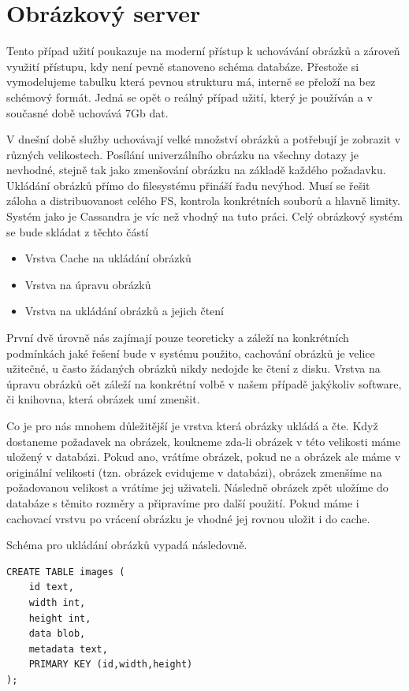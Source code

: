 \section{Obrázkový server}
Tento případ užití poukazuje na moderní přístup k uchovávání obrázků a zároveň využití přístupu, kdy není pevně stanoveno schéma databáze. Přestože si vymodelujeme tabulku která pevnou strukturu má, interně se přeloží na bez schémový formát. Jedná se opět o reálný případ užití, který je používán a v současné době uchovává 7Gb dat. 

V dnešní době služby uchovávají velké množství obrázků a potřebují je zobrazit v různých velikostech. Posílání univerzálního obrázku na všechny dotazy je nevhodné, stejně tak jako zmenšování obrázku na základě každého požadavku. Ukládání obrázků přímo do filesystému přináší řadu nevýhod. Musí se řešit záloha a distribuovanost celého FS, kontrola konkrétních souborů a hlavně limity. Systém jako je Cassandra je víc než vhodný na tuto práci. Celý obrázkový systém se bude skládat z těchto částí

\begin{itemize}
\item Vrstva Cache na ukládání obrázků
\item Vrstva na úpravu obrázků 
\item Vrstva na ukládání obrázků a jejich čtení
\end{itemize}	


První dvě úrovně nás zajímají pouze teoreticky a záleží na konkrétních podmínkách jaké řešení bude v systému použito, cachování obrázků je velice užitečné, u často žádaných obrázků nikdy nedojde ke čtení z disku. Vrstva na úpravu obrázků oět záleží na konkrétní volbě v našem případě jakýkoliv software, či knihovna, která obrázek umí zmenšit. 

Co je pro nás mnohem důležitější je vrstva která obrázky ukládá a čte. Když dostaneme požadavek na obrázek, koukneme zda-li obrázek v této velikosti máme uložený v databázi. Pokud ano, vrátíme obrázek, pokud ne a obrázek ale máme v originální velikosti (tzn. obrázek evidujeme v databázi), obrázek zmenšíme na požadovanou velikost a vrátíme jej uživateli. Následně obrázek zpět uložíme do databáze s těmito rozměry a připravíme pro další použití. Pokud máme i cachovací vrstvu po vrácení obrázku je vhodné jej rovnou uložit i do cache. 

Schéma pro ukládání obrázků vypadá následovně. 

\begin{lstlisting}[caption={Tabulka pro ukládání obrázků v různých velikostech},label=img1]
CREATE TABLE images ( 
	id text,
	width int,
	height int,
	data blob,
	metadata text, 
	PRIMARY KEY (id,width,height) 
);
\end{lstlisting}

